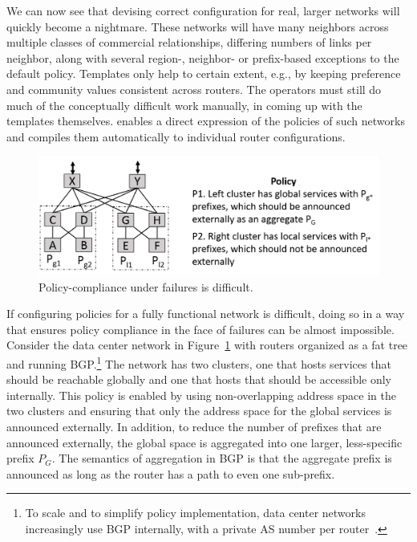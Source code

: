 We can now see that devising correct configuration for real, larger networks will quickly become a nightmare. These networks will have many neighbors across multiple classes of commercial relationships, differing numbers of links per neighbor, along with several region-, neighbor- or prefix-based exceptions to the default policy. Templates only help to certain extent, e.g., by keeping preference and community values consistent across routers. The operators must still do much of the conceptually difficult work manually, in coming up with the templates themselves. \sysname enables a direct expression of the policies of such networks and compiles them automatically to individual router configurations.

\begin{figure}[t!]
\centering
\includegraphics[width=\columnwidth]{figures/example2}
\caption{Policy-compliance under failures is difficult.}
\label{fig:example2}
\end{figure}


If configuring policies for a fully functional network is difficult, doing so in a way that ensures policy compliance in the face of failures can be almost impossible. Consider the data center network in Figure~\ref{fig:example2} with routers organized as a fat tree and running BGP.\footnote{To scale and to simplify policy implementation, data center networks increasingly use BGP internally, with a private AS number per router~\cite{bgp-in-dc-rfc}.} The network has two clusters, one that hosts services that should be reachable globally and one that hosts that should be accessible only internally. This policy is enabled by using non-overlapping address space in the two clusters and ensuring that only the address space for the global services is announced externally. In addition, to reduce the number of prefixes that are announced externally, the global space is aggregated into one larger, less-specific prefix $P_G$. The semantics of aggregation in BGP is that the aggregate prefix is announced as long as the router has a path to even one sub-prefix.

